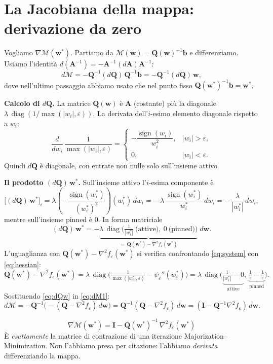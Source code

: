 \documentclass[11pt,a4paper]{article}
\theoremstyle{definition}
\newcommand{\w}{\bm{w}}
\newcommand{\A}{\bm{A}}
\newcommand{\bvec}{\bm{b}}
\newcommand{\Q}{\bm{Q}}
\newcommand{\Id}{\bm{I}}
\newcommand{\wstar}{\w^{*}}
\newcommand{\Mmap}{\mathcal{M}}
\newcommand{\diag}{\operatorname{diag}}
\newcommand{\sign}{\operatorname{sign}}
\newcommand{\lam}{\lambda}
\newcommand{\eps}{\varepsilon}
\begin{document}
\section{La Jacobiana della mappa: derivazione da zero}
\label{sec:jacobian}

Vogliamo $\nabla\Mmap(\wstar)$. Partiamo da $\Mmap(\w)=\Q(\w)^{-1}\bvec$ e differenziamo.
Usiamo l'identità $d(\bm A^{-1})=-\bm A^{-1}(d\bm A)\bm A^{-1}$:
\begin{equation}
\label{eq:dM1}
d\Mmap=-\Q^{-1}(d\Q)\,\Q^{-1}\bvec=-\Q^{-1}(d\Q)\,\w ,
\end{equation}
dove nell'ultimo passaggio abbiamo usato che nel punto fisso $\Q(\wstar)^{-1}\bvec=\wstar$.

\medskip
\noindent\textbf{Calcolo di $d\Q$.} La matrice $\Q(\w)$ è $\A$ (costante) più la diagonale
$\lam\,\diag(1/\max(|w_i|,\eps))$. La derivata dell'$i$-esimo elemento diagonale rispetto a
$w_i$:
\[
\frac{d}{dw_i}\,\frac{1}{\max(|w_i|,\eps)}=
\begin{cases}
-\dfrac{\sign(w_i)}{w_i^2}, & |w_i|>\eps,\\[4pt]
0, & |w_i|<\eps.
\end{cases}
\]
Quindi $d\Q$ è diagonale, con entrate non nulle solo sull'insieme attivo.

\medskip
\noindent\textbf{Il prodotto $(d\Q)\,\wstar$.} Sull'insieme attivo l'$i$-esima componente è
\[
\big[(d\Q)\,\wstar\big]_i=\lam\left(-\frac{\sign(w^*_i)}{(w^*_i)^2}\right)(w^*_i)\,dw_i
=-\,\lam\,\frac{\sign(w^*_i)}{w^*_i}\,dw_i
=-\,\frac{\lam}{|w^*_i|}\,dw_i ,
\]
mentre sull'insieme pinned è $0$. In forma matriciale
\begin{equation}
\label{eq:dQw}
(d\Q)\,\wstar=-\underbrace{\lam\,\diag\!\Big(\tfrac{1}{|w^*_i|}\ \text{(attive)},\ 0\ \text{(pinned)}\Big)}_{=\,\Q(\wstar)-\nabla^2 f_\eps(\wstar)}\;d\w .
\end{equation}
L'uguaglianza con $\Q(\wstar)-\nabla^2 f_\eps(\wstar)$ si verifica confrontando \eqref{eq:system}
con \eqref{eq:hessian}:
\[
\Q(\wstar)-\nabla^2 f_\eps(\wstar)=\lam\,\diag\!\Big(\tfrac{1}{\max(|w^*_i|,\eps)}-\psi_\eps''(w^*_i)\Big)
=\lam\,\diag\!\Big(\underbrace{\tfrac{1}{|w^*_i|}-0}_{\text{attive}},\ \underbrace{\tfrac1\eps-\tfrac1\eps}_{\text{pinned}}\Big).
\]
Sostituendo \eqref{eq:dQw} in \eqref{eq:dM1}:
\[
d\Mmap=-\Q^{-1}\Big(-(\Q-\nabla^2 f_\eps)\,d\w\Big)
=\Q^{-1}(\Q-\nabla^2 f_\eps)\,d\w=(\Id-\Q^{-1}\nabla^2 f_\eps)\,d\w .
\]

\begin{keybox}
\begin{equation}
\label{eq:jac}
\boxed{\ \nabla\Mmap(\wstar)=\Id-\Q(\wstar)^{-1}\,\nabla^2 f_\eps(\wstar)\ }
\end{equation}
È \emph{esattamente} la matrice di contrazione di una iterazione Majorization--Minimization.
Non l'abbiamo presa per citazione: l'abbiamo \emph{derivata} differenziando la mappa.
\end{keybox}
\end{document}
